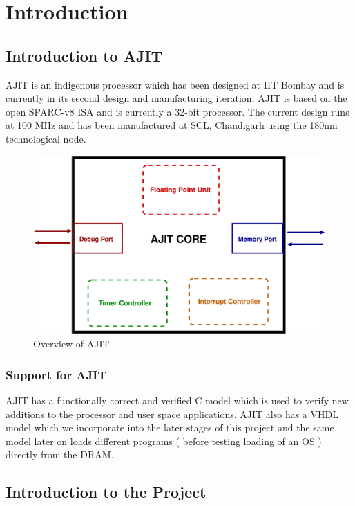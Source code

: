 \chapter{Introduction}

\section{Introduction to AJIT}

AJIT is an indigenous processor which has been designed at IIT Bombay and is currently in its second design and manufacturing iteration.
AJIT is based on the open SPARC-v8 ISA and is currently a 32-bit processor. The current design runs at 100 MHz and has been manufactured at
SCL, Chandigarh using the 180nm technological node.

\begin{figure}[H]
\centering
\includegraphics[scale=0.7]{eps_pdf_sources/ajit_fpga/AJIT/ajit_intro}
\caption{Overview of AJIT}
\end{figure}

\subsection{Support for AJIT}

AJIT has a functionally correct and verified C model which is used to verify new additions to the processor and user space
applications. AJIT also has a VHDL model which we incorporate into the later stages of this project and the same model later on loads
different programs ( before testing loading of an OS ) directly from the DRAM. 

\section{Introduction to the Project}


